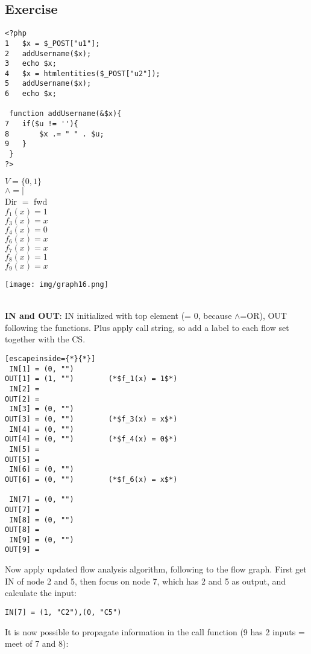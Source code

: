 \documentclass[a4paper, 10pt, titlepage]{article}
\begin{document}
\subsection{Exercise}
\begin{minipage}{0.56\textwidth}
\begin{lstlisting}
<?php
1	$x = $_POST["u1"];
2 	addUsername($x);
3	echo $x;
4 	$x = htmlentities($_POST["u2"]);
5	addUsername($x);
6 	echo $x;

 function addUsername(&$x){
7	if($u != ''){
8		$x .= " " . $u;
9	}
 }
?>
\end{lstlisting}
\end{minipage} \vline \hfill
\begin{minipage}{0.14\textwidth}
$ V = \{0,1\}$\\
$ \wedge = | $\\
Dir $=$ fwd \medskip\\
$f_1(x) = 1$\\
$f_3(x) = x$\\
$f_4(x) = 0$\\
$f_6(x) = x$\\
$f_7(x) = x$\\
$f_8(x) = 1$\\
$f_9(x) = x$
\end{minipage}
\begin{minipage}{0.2\textwidth}
\texttt{[image: img/graph16.png]}
\end{minipage} \bigskip\\
\textbf{IN and OUT}: IN initialized with top element (= 0, because $\wedge$=OR), OUT following the functions. Plus apply call string, so add a label to each flow set together with the CS.
\begin{lstlisting}[escapeinside={*}{*}]
 IN[1] = (0, "")
OUT[1] = (1, "")		(*$f_1(x) = 1$*)
 IN[2] =
OUT[2] = 
 IN[3] = (0, "")
OUT[3] = (0, "")		(*$f_3(x) = x$*)
 IN[4] = (0, "")
OUT[4] = (0, "")		(*$f_4(x) = 0$*)
 IN[5] =
OUT[5] = 
 IN[6] = (0, "")
OUT[6] = (0, "")		(*$f_6(x) = x$*)

 IN[7] = (0, "")
OUT[7] = 
 IN[8] = (0, "")
OUT[8] = 
 IN[9] = (0, "")
OUT[9] = 
\end{lstlisting}
Now apply updated flow analysis algorithm, following to the flow graph. First get IN of node 2 and 5, then focus on node 7, which has 2 and 5 as output, and calculate the input:
\begin{verbatim}
IN[7] = (1, "C2"),(0, "C5")
\end{verbatim}
It is now possible to propagate information in the call function (9 has 2 inputs = meet of 7 and 8):
\end{document}
